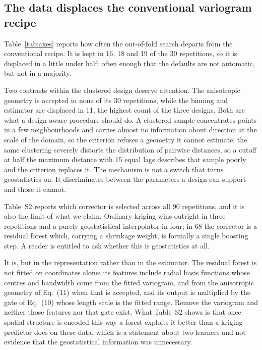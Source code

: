 \documentclass[preprint,12pt,authoryear]{elsarticle}
\begin{document}
\subsection{The data displaces the conventional variogram recipe}

Table~\ref{tab:axes} reports how often the out-of-fold search departs from the
conventional recipe. It is kept in 16, 18 and 19 of the 30 repetitions, so it is
displaced in a little under half: often enough that the defaults are not
automatic, but not in a majority.

\begin{table}[!ht]
\centering
\caption{Repetitions, out of 30 per design, in which the out-of-fold search departs from the conventional recipe: an exponential family, a cutoff at half the maximum distance, 15 lags, the robust estimator, a bandwidth of half the practical range, and isotropy.}
\label{tab:axes}
\small
\setlength{\tabcolsep}{3pt}

\end{table}

Two contrasts within the clustered design deserve attention. The anisotropic
geometry is accepted in none of its 30 repetitions, while the binning and
estimator are displaced in 11, the highest count of the three designs. Both are
what a design-aware procedure should do. A clustered sample concentrates points
in a few neighbourhoods and carries almost no information about direction at the
scale of the domain, so the criterion refuses a geometry it cannot estimate; the
same clustering severely distorts the distribution of pairwise distances, so a
cutoff at half the maximum distance with 15 equal lags describes that sample
poorly and the criterion replaces it. The mechanism is not a switch that turns
geostatistics on. It discriminates between the parameters a design can support
and those it cannot.

Table~S2 reports which corrector is selected across all 90
repetitions, and it is also the limit of what we claim. Ordinary kriging wins
outright in three repetitions and a purely geostatistical interpolator in four;
in 68 the corrector is a residual forest which, carrying a shrinkage weight, is
formally a single boosting step. A reader is entitled to ask whether this is
geostatistics at all.

It is, but in the representation rather than in the estimator. The residual
forest is not fitted on coordinates alone: its features include radial basis
functions whose centres and bandwidth come from the fitted variogram, and from
the anisotropic geometry of Eq.~(11) when that is accepted, and its output is
multiplied by the gate of Eq.~(10) whose length scale is the fitted range.
Remove the variogram and neither those features nor that gate exist. What
Table~S2 shows is that once spatial structure is encoded this way a
forest exploits it better than a kriging predictor does on these data, which is
a statement about two learners and not evidence that the geostatistical
information was unnecessary.
\end{document}

